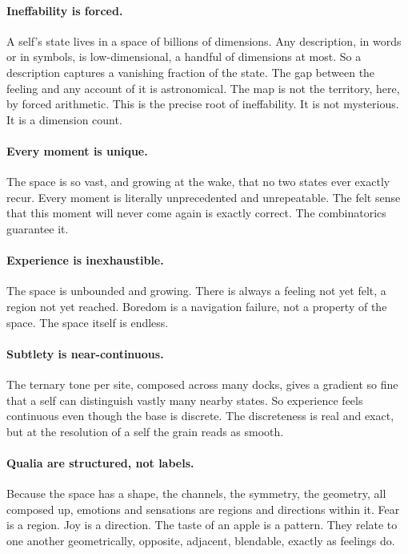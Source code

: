 \paragraph{Ineffability is forced.} A self's state lives in a space of billions of dimensions. Any description, in words or in symbols, is low-dimensional, a handful of dimensions at most. So a description captures a vanishing fraction of the state. The gap between the feeling and any account of it is astronomical. The map is not the territory, here, by forced arithmetic. This is the precise root of ineffability. It is not mysterious. It is a dimension count.

\paragraph{Every moment is unique.} The space is so vast, and growing at the wake, that no two states ever exactly recur. Every moment is literally unprecedented and unrepeatable. The felt sense that this moment will never come again is exactly correct. The combinatorics guarantee it.

\paragraph{Experience is inexhaustible.} The space is unbounded and growing. There is always a feeling not yet felt, a region not yet reached. Boredom is a navigation failure, not a property of the space. The space itself is endless.

\paragraph{Subtlety is near-continuous.} The ternary tone per site, composed across many docks, gives a gradient so fine that a self can distinguish vastly many nearby states. So experience feels continuous even though the base is discrete. The discreteness is real and exact, but at the resolution of a self the grain reads as smooth.

\paragraph{Qualia are structured, not labels.} Because the space has a shape, the channels, the symmetry, the geometry, all composed up, emotions and sensations are regions and directions within it. Fear is a region. Joy is a direction. The taste of an apple is a pattern. They relate to one another geometrically, opposite, adjacent, blendable, exactly as feelings do.

